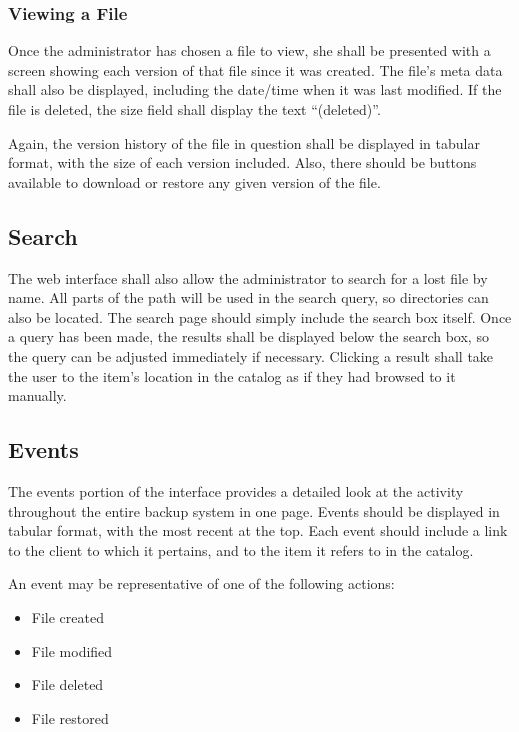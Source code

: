 \subsubsection{Viewing a File}

Once the administrator has chosen a file to view, she shall be presented with
a screen showing each version of that file since it was created. The file's
meta data shall also be displayed, including the date/time when it was last
modified. If the file is deleted, the size field shall display the text
``(deleted)''.

Again, the version history of the file in question shall be displayed in
tabular format, with the size of each version included. Also, there should be
buttons available to download or restore any given version of the file.

\subsection{Search}

The web interface shall also allow the administrator to search for a lost file
by name. All parts of the path will be used in the search query, so directories
can also be located. The search page should simply include the search box
itself. Once a query has been made, the results shall be displayed below the
search box, so the query can be adjusted immediately if necessary. Clicking
a result shall take the user to the item's location in the catalog as if they
had browsed to it manually.

\subsection{Events}

The events portion of the interface provides a detailed look at the activity
throughout the entire backup system in one page. Events should be displayed in
tabular format, with the most recent at the top. Each event should include
a link to the client to which it pertains, and to the item it refers to in the
catalog.

An event may be representative of one of the following actions:

\begin{itemize}
    \item File created
    \item File modified
    \item File deleted
    \item File restored
\end{itemize}

